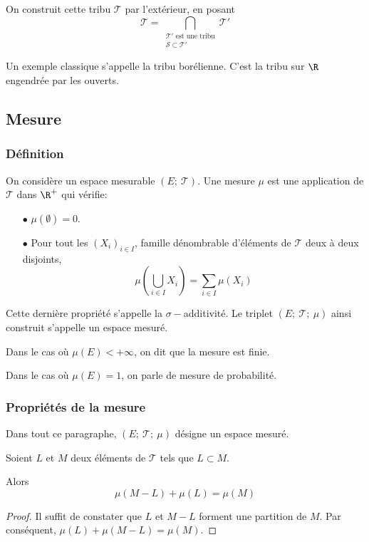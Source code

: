 On construit cette tribu $\mathcal{T}$ par l'extérieur, en posant
\[
\mathcal{T} = \bigcap  \limits_{\substack{\mathcal{T'} \text{ est une tribu}\\ \mathcal{S} \subset \mathcal{T'}}} \mathcal{T'}
\]

Un exemple classique s'appelle la tribu borélienne. C'est la tribu sur $\R$ engendrée par les ouverts.


\subsection{Mesure}

\subsubsection{Définition}

On considère un espace mesurable $\left(E;~\mathcal{T}\right)$. Une mesure $\mu$ est une application de $\mathcal{T}$ dans $\R^{+}$ qui vérifie:
\begin{itemize}
\item[$\bullet$]  $\mu(\emptyset)=0$.
\item[$\bullet$] Pour tout les $(X_i)_{i \in I}$, famille dénombrable d'éléments de $\mathcal{T}$ deux à deux disjoints, \[\mu\left(\bigcup \limits_{i \in I} X_i\right) = \displaystyle{\sum \limits_{i \in I}} \mu(X_i)\]
\end{itemize}

Cette dernière propriété s'appelle la $\sigma-$additivité. Le triplet $\left(E;~\mathcal{T};~\mu\right)$ ainsi construit s'appelle un espace mesuré.

Dans le cas où $\mu(E) < +\infty$, on dit que la mesure est finie.

Dans le cas où $\mu(E) = 1$, on parle de mesure de probabilité.

\subsubsection{Propriétés de la mesure}

Dans tout ce paragraphe, $\left(E;~\mathcal{T};~\mu\right)$ désigne un espace mesuré.

\begin{prop}[Soustraction]
Soient $L$ et $M$ deux éléments de $\mathcal{T}$ tels que $L \subset M$.

Alors
\[
\mu(M-L) + \mu(L)=\mu(M)
\]
\end{prop}


\begin{proof}
Il suffit de constater que $L$ et $M-L$ forment une partition de $M$. Par conséquent, $\mu(L)+\mu(M-L) = \mu(M)$.
\end{proof}


